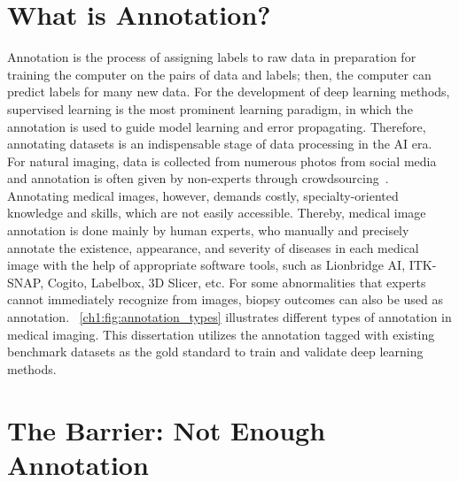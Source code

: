 \section{What is Annotation?}
\label{ch1:challenge_opportunity:annotation}


Annotation is the process of assigning labels to raw data in preparation for training the computer on the pairs of data and labels; then, the computer can predict labels for many new data. For the development of deep learning methods, supervised learning is the most prominent learning paradigm, in which the annotation is used to guide model learning and error propagating. Therefore, annotating datasets is an indispensable stage of data processing in the AI era. For natural imaging, data is collected from numerous photos from social media and annotation is often given by non-experts through crowdsourcing~\citep{kovashka2016crowdsourcing}. Annotating medical images, however, demands costly, specialty-oriented knowledge and skills, which are not easily accessible. Thereby, medical image annotation is done mainly by human experts, who manually and precisely annotate the existence, appearance, and severity of diseases in each medical image with the help of appropriate software tools, such as Lionbridge AI, ITK-SNAP, Cogito, Labelbox, 3D Slicer, etc. For some abnormalities that experts cannot immediately recognize from images, biopsy outcomes can also be used as annotation. \figurename~\ref{ch1:fig:annotation_types} illustrates different types of annotation in medical imaging. This dissertation utilizes the annotation tagged with existing benchmark datasets as the gold standard to train and validate deep learning methods.



\section{The Barrier: Not Enough Annotation}
\label{ch1:challenge_opportunity:barrier}

